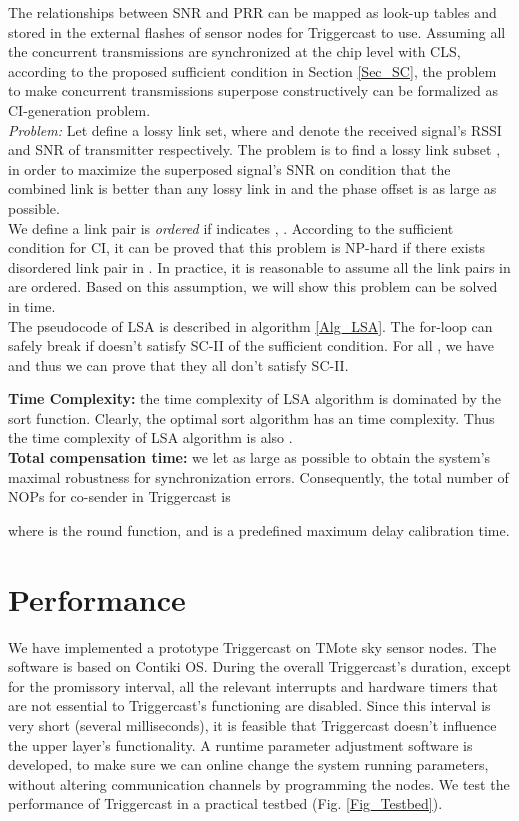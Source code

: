 \documentclass[conference]{IEEEtran}
\begin{document}
The relationships between SNR and PRR can be mapped as look-up tables and stored in the external flashes of sensor nodes for Triggercast to use. Assuming all the concurrent transmissions are synchronized at the chip level with CLS, according to the proposed sufficient condition in Section \ref{Sec_SC}, the problem to make concurrent transmissions superpose constructively can be formalized as CI-generation problem.\\
\indent \emph{Problem:} Let  define a lossy link set, where  and  denote the received signal's RSSI and SNR of transmitter  respectively.
The problem is to find a lossy link subset , in order to maximize the superposed signal's SNR on condition that the combined link is better than any lossy link in  and the phase offset  is as large as possible.\\\indent We define a link pair  is \emph{ordered} if  indicates , .
According to the sufficient condition for CI, it can be proved that this problem is NP-hard if there exists disordered link pair in .
In practice, it is reasonable to assume all the link pairs in  are ordered.
Based on this assumption, we will show this problem can be solved in  time. \\
\indent The pseudocode of LSA is described in algorithm \ref{Alg_LSA}. The for-loop can safely break if  doesn't satisfy SC-II of the sufficient condition.
For all , we have  and thus we can prove that they all don't satisfy SC-II.

\indent \textbf{Time Complexity:} the time complexity of LSA algorithm is dominated by the sort function.
Clearly, the optimal sort algorithm has an  time complexity.
Thus the time complexity of LSA algorithm is also .\\
\indent \textbf{Total compensation time:} we let  as large as possible to obtain the system's maximal robustness for synchronization errors. Consequently, the total number  of NOPs for co-sender  in Triggercast is

where  is the round function, and  is a predefined maximum delay calibration time.
\section{Performance}
\label{Sec_experiments}
We have implemented a prototype Triggercast on TMote sky sensor nodes.
The software is based on Contiki OS.
During the overall Triggercast's duration, except for the promissory interval, all the relevant interrupts and hardware timers that are not essential to Triggercast's functioning are disabled.
Since this interval is very short (several milliseconds), it is feasible that Triggercast doesn't influence the upper layer's functionality.
A runtime parameter adjustment software is developed, to make sure we can online change the system running parameters, without altering communication channels by programming the nodes.
We test the performance of Triggercast in a practical testbed (Fig. \ref{Fig_Testbed}).
\end{document}
